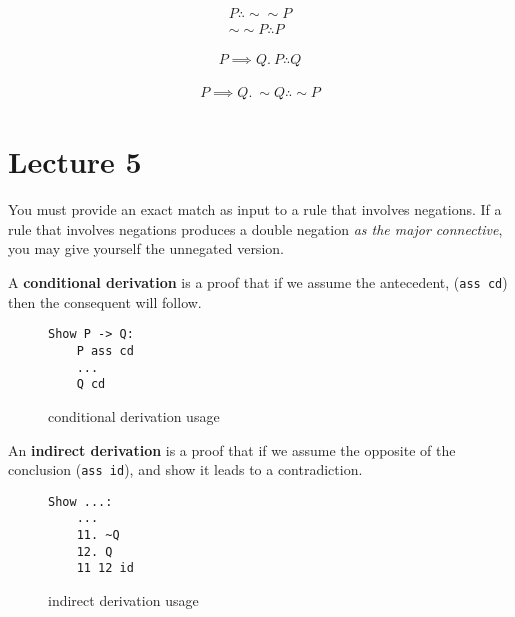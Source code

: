 \documentclass[11pt]{article}
\begin{document}
		\begin{rules}
			\begin{gather}
				P \therefore \sim \sim P \\
				\sim \sim P \therefore P
			\end{gather}
		\end{rules}
		
		\begin{rules}
			\begin{gather}
				P \implies Q.\ P \therefore Q
			\end{gather}
		\end{rules}
		
		\begin{rules}
			\begin{gather}
				P \implies Q.\ \sim Q \therefore \sim P
			\end{gather}
		\end{rules}
	
	\section{Lecture 5}
	\begin{remark}
		You must provide an exact match as input to a rule that involves negations.
		If a rule that involves negations produces a double negation \emph{as the major connective}, you may give yourself the unnegated version.
	\end{remark}
	
	\begin{definition}
		A \textbf{conditional derivation} is a proof that if we assume the antecedent, (\texttt{ass cd}) then the consequent will follow.
	\end{definition}
	\begin{figure}
		\centering
		\begin{BVerbatim}
Show P -> Q:
	P ass cd
	...
	Q cd
		\end{BVerbatim}
		\caption{conditional derivation usage}
	\end{figure}
	
	\begin{definition}
		An \textbf{indirect derivation} is a proof that if we assume the opposite of the conclusion (\texttt{ass id}), and show it leads to a contradiction.
	\end{definition}
	\begin{figure}
		\centering
		\begin{BVerbatim}
Show ...:
	...
	11. ~Q
	12. Q
	11 12 id
		\end{BVerbatim}
		\caption{indirect derivation usage}
	\end{figure}
	
\end{document}
